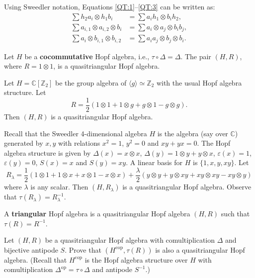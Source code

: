 Using Sweedler notation, Equations \eqref{QT:1}--\eqref{QT:3} can
be written as:
\begin{align*}
\sum h_{2}a_{i}\otimes h_{1}b_{i} & =\sum a_{i}h_{1}\otimes b_{i}h_{2},\\
\sum a_{i,1}\otimes a_{i,2}\otimes b_{i} & =\sum a_{i}\otimes a_{j}\otimes b_{i}b_{j},\\
\sum a_{i}\otimes b_{i,1}\otimes b_{i,2} & =\sum a_{i}a_{j}\otimes b_{j}\otimes b_{i}.
\end{align*}

\begin{example}
Let $H$ be a \textbf{cocommutative} Hopf algebra, i.e.,
$\tau\circ\Delta=\Delta$.  The pair $(H,R)$, where $R=1\otimes1$, is a
quasitriangular Hopf algebra.
\end{example}

\begin{example}
Let $H=\mathbb{C}[\mathbb{Z}_{2}]$ be the group algebra of $\langle
g\rangle\simeq\mathbb{Z}_{2}$ with the usual Hopf algebra structure. Let 
\[
R=\frac{1}{2}(1\otimes1+1\otimes g+g\otimes1-g\otimes g).
\]
Then $(H,R)$ is a quasitriangular Hopf algebra.
\end{example}

\begin{example}
Recall that the Sweedler 4-dimensional algebra $H$ is the algebra (say over
$\mathbb{C}$) generated by $x,y$ with relations $x^{2}=1$, $y^{2}=0$ and
$xy+yx=0$.  The Hopf algebra structure is given by $\Delta(x)=x\otimes x$,
$\Delta(y)=1\otimes y+y\otimes x$, $\varepsilon(x)=1$, $\varepsilon(y)=0$,
$S(x)=x$ and $S(y)=xy$.  A linear basis for $H$ is $\{1,x,y,xy\}$. Let
\[
R_{\lambda}=\frac{1}{2}(1\otimes1+1\otimes x+x\otimes1-x\otimes x)+\frac{\lambda}{2}(y\otimes y+y\otimes xy+xy\otimes xy-xy\otimes y)
\]
where $\lambda$ is any scalar. Then $(H,R_{\lambda})$ is a quasitriangular
Hopf algebra. Observe that $\tau(R_{\lambda})=R_{\lambda}^{-1}$.
\end{example}

\begin{definition}
A \textbf{triangular} Hopf algebra is a quasitriangular Hopf algebra
$(H,R)$ such that $\tau(R)=R^{-1}$. 
\end{definition}

\begin{exercise}
Let $(H,R)$ be a quasitriangular Hopf algebra with comultiplication $\Delta$
and bijective antipode $S$. Prove that $(H^{\mathrm{cop}},\tau(R))$ is also a
quasitriangular Hopf algebra. (Recall that $H^{\mathrm{cop}}$ is the Hopf
algebra structure over $H$ with comultiplication
$\Delta^{\mathrm{op}}=\tau\circ\Delta$ and antipode $S^{-1}$.)
\end{exercise}

